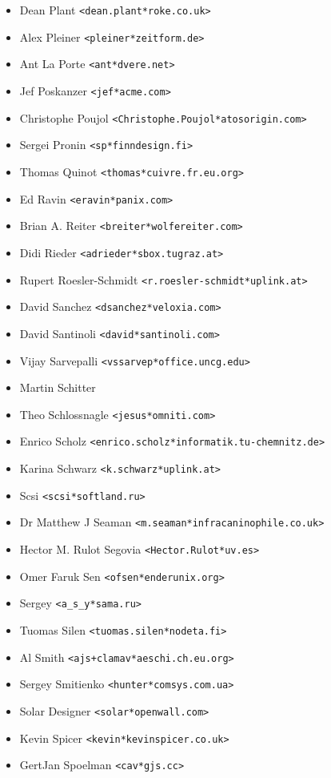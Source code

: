 \documentclass[a4paper,titlepage,12pt]{article}
\newcommand{\email}[1]{\texttt{#1}}
\begin{document}
\begin{itemize}
	\item Dean Plant \email{<dean.plant*roke.co.uk>}
	\item Alex Pleiner \email{<pleiner*zeitform.de>}
	\item Ant La Porte \email{<ant*dvere.net>}
	\item Jef Poskanzer \email{<jef*acme.com>}
	\item Christophe Poujol \email{<Christophe.Poujol*atosorigin.com>}
	\item Sergei Pronin \email{<sp*finndesign.fi>}
	\item Thomas Quinot \email{<thomas*cuivre.fr.eu.org>}
	\item Ed Ravin \email{<eravin*panix.com>}
	\item Brian A. Reiter \email{<breiter*wolfereiter.com>}
	\item Didi Rieder \email{<adrieder*sbox.tugraz.at>}
	\item Rupert Roesler-Schmidt \email{<r.roesler-schmidt*uplink.at>}
	\item David Sanchez \email{<dsanchez*veloxia.com>}
	\item David Santinoli \email{<david*santinoli.com>}
	\item Vijay Sarvepalli \email{<vssarvep*office.uncg.edu>}
	\item Martin Schitter
	\item Theo Schlossnagle \email{<jesus*omniti.com>}
	\item Enrico Scholz \email{<enrico.scholz*informatik.tu-chemnitz.de>}
	\item Karina Schwarz \email{<k.schwarz*uplink.at>}
	\item Scsi \email{<scsi*softland.ru>}
	\item Dr Matthew J Seaman \email{<m.seaman*infracaninophile.co.uk>}
	\item Hector M. Rulot Segovia \email{<Hector.Rulot*uv.es>}
	\item Omer Faruk Sen \email{<ofsen*enderunix.org>}
	\item Sergey \email{<a\_s\_y*sama.ru>}
	\item Tuomas Silen \email{<tuomas.silen*nodeta.fi>}
	\item Al Smith \email{<ajs+clamav*aeschi.ch.eu.org>}
	\item Sergey Smitienko \email{<hunter*comsys.com.ua>}
	\item Solar Designer \email{<solar*openwall.com>}
	\item Kevin Spicer \email{<kevin*kevinspicer.co.uk>}
	\item GertJan Spoelman \email{<cav*gjs.cc>}

\end{itemize}
\end{document}

